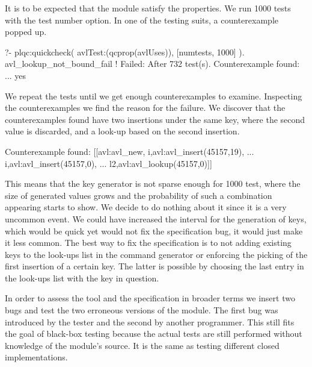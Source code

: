 It is to be expected that the module satisfy the properties.
%
We run 1000 tests with the test number option.
%
In one of the testing suits, a counterexample popped up.
\begin{yapcode}
   ?- plqc:quickcheck(
                avlTest:(qcprop(avlUses)),
                [{numtests, 1000}] ).
 avl_lookup_not_bound_fail
 !
 Failed: After 732 test(s).
 Counterexample found: ...
 yes
\end{yapcode}
%
We repeat the tests until we get enough counterexamples to examine.
%
Inspecting the counterexamples we find the reason for the failure.
%
We discover that the counterexamples found have two insertions under the
same key, where the second value is discarded, and a look-up based on
the second insertion.
%
\begin{yapcode}
 Counterexample found:
   [[avl:avl_new,
     {i,avl:avl_insert(45157,19)},
     ...
     {i,avl:avl_insert(45157,0)},
     ...
     {l2,avl:avl_lookup(45157,0)}]] 
\end{yapcode}
%
This means that the key generator is not sparse enough for 1000 test,
where the size of generated values grows and the probability of such a
combination appearing starts to show.
%
We decide to do nothing about it since it is a very uncommon event.
%
We could have increased the interval for the generation of keys, which
would be quick yet would not fix the specification bug, it would just
make it less common.
%
The best way to fix the specification is to not adding existing keys to
the look-ups list in the command generator or enforcing the picking of
the first insertion of a certain key.
%
The latter is possible by choosing the last entry in the look-ups list
with the key in question.


In order to  assess the tool and the specification in broader terms we
insert two bugs and test the two erroneous versions of the module.
%
The first bug was introduced by the tester and the second by another
programmer.
%
This still fits the goal of black-box testing because the actual tests
are still performed without knowledge of the module's source.
%
It is the same as testing different closed implementations.


